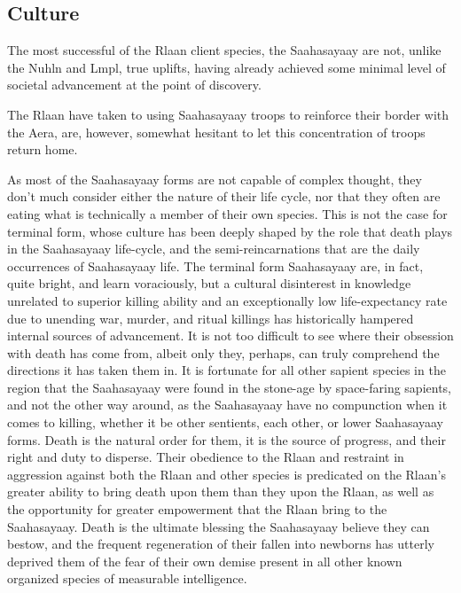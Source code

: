 \subsection{Culture}

The most successful of the Rlaan client species, the Saahasayaay are
not, unlike the Nuhln and Lmpl, true uplifts, having already achieved
some minimal level of societal advancement at the point of discovery.

The Rlaan have taken to using Saahasayaay troops to reinforce their
border with the Aera, are, however, somewhat hesitant to let this
concentration of troops return home.

As most of the Saahasayaay forms are not capable of complex thought,
they don't much consider either the nature of their life cycle, nor
that they often are eating what is technically a member of their own
species. This is not the case for terminal form, whose culture has
been deeply shaped by the role that death plays in the Saahasayaay
life-cycle, and the semi-reincarnations that are the daily occurrences
of Saahasayaay life. The terminal form Saahasayaay are, in fact, quite
bright, and learn voraciously, but a cultural disinterest in knowledge
unrelated to superior killing ability and an exceptionally low
life-expectancy rate due to unending war, murder, and ritual killings
has historically hampered internal sources of advancement. It is not
too difficult to see where their obsession with death has come from,
albeit only they, perhaps, can truly comprehend the directions it has
taken them in. It is fortunate for all other sapient species in the
region that the Saahasayaay were found in the stone-age by
space-faring sapients, and not the other way around, as the
Saahasayaay have no compunction when it comes to killing, whether it
be other sentients, each other, or lower Saahasayaay forms. Death is
the natural order for them, it is the source of progress, and their
right and duty to disperse. Their obedience to the Rlaan and restraint
in aggression against both the Rlaan and other species is predicated
on the Rlaan's greater ability to bring death upon them than they upon
the Rlaan, as well as the opportunity for greater empowerment that the
Rlaan bring to the Saahasayaay. Death is the ultimate blessing the
Saahasayaay believe they can bestow, and the frequent regeneration of
their fallen into newborns has utterly deprived them of the fear of
their own demise present in all other known organized species of
measurable intelligence.


